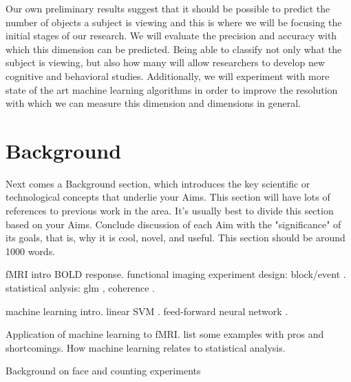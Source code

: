 \documentclass[12pt]{article}
\begin{document}
Our own preliminary results suggest that it should be possible to predict the number of objects a subject is viewing and this is where we will be focusing the initial stages of our research.
We will evaluate the precision and accuracy with which this dimension can be predicted.
Being able to classify not only what the subject is viewing, but also how many will allow researchers to develop new cognitive and behavioral studies. 
Additionally, we will experiment with more state of the art machine learning algorithms in order to improve the resolution with which we can measure this dimension and dimensions in general.

\section{Background}
Next comes a Background section, which introduces the key scientific or technological concepts that underlie your Aims. 
This section will have lots of references to previous work in the area. 
It's usually best to divide this section based on your Aims. 
Conclude discussion of each Aim with the "significance" of its goals, that is, why it is cool, novel, and useful. 
This section should be around 1000 words.

fMRI intro
BOLD response.
functional imaging experiment design: block/event \cite{Dale1997,Liu2001}.
statistical anlysis: glm \cite{Worsley1995,Beckmann2003}, coherence \cite{Bandettini1993}.

machine learning intro.
linear SVM \cite{Burges1998}.
feed-forward neural network \cite{Hecht-nielsen1989,Jain1996}.

Application of machine learning to fMRI.
list some examples \cite{Haxby2001,Mitchell2003,Haynes2006} with pros and shortcomings.
How machine learning relates to statistical analysis.

Background on face \cite{McCarthy1997,Haxby2001} and counting \cite{Bush1998} \cite{Rickard2000} \cite{Eliez2001} \cite{Mostofsky2003} experiments
\end{document}
